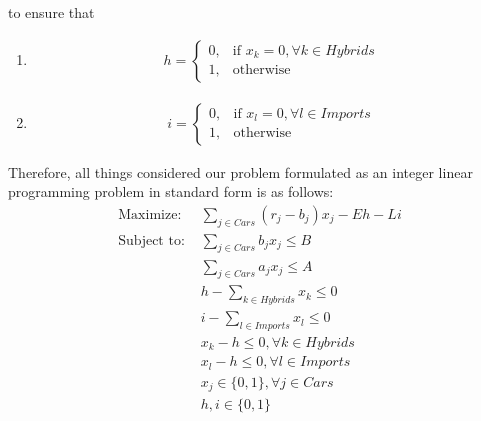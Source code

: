 \documentclass{article}
\begin{document}
to ensure that 
\begin{enumerate}
    \item \begin{align*}
            h=
            \begin{cases}
            0, &\text{if $x_k=0, \forall k \in Hybrids$}\\
            1, &\text{otherwise}
            \end{cases}
           \end{align*}
    \item \begin{align*}
            i=
              \begin{cases}
            0, &\text{if $x_l=0, \forall l \in Imports$}\\
            1, &\text{otherwise}
            \end{cases}
           \end{align*}
\end{enumerate}



Therefore, all things considered our problem formulated as an integer linear programming problem in standard form is as follows:
\begin{align*}
    \text{Maximize: } &\sum_{j\in Cars} (r_j - b_j)x_j - Eh - Li\\
    \text{Subject to: } &\sum_{j\in Cars} b_jx_j\leq B\\
                        &\sum_{j\in Cars} a_jx_j\leq A\\
                        & h-\sum_{k\in Hybrids}x_k \leq 0\\
                        & i-\sum_{l\in Imports}x_l \leq 0\\
                        & x_k-h\leq 0, \forall k \in Hybrids\\
                        & x_l-h \leq 0, \forall l \in Imports\\
                        & x_j \in \{0,1\}, \forall j \in Cars\\
                        &h, i \in \{0, 1\}
\end{align*}
\end{document}
